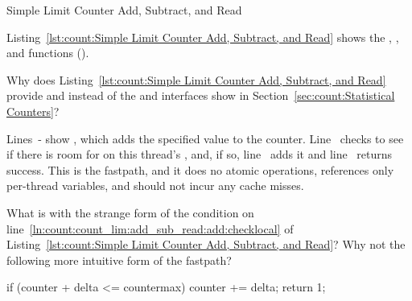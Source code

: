 \begin{listing}[tbp]

\caption{Simple Limit Counter Add, Subtract, and Read}
\label{lst:count:Simple Limit Counter Add, Subtract, and Read}
\end{listing}

Listing~\ref{lst:count:Simple Limit Counter Add, Subtract, and Read}
shows the , , and 
functions ().


\QuickQuiz{}
	Why does
	Listing~\ref{lst:count:Simple Limit Counter Add, Subtract, and Read}
	provide  and  instead of the
	 and  interfaces show in
	Section~\ref{sec:count:Statistical Counters}?
 \QuickQuizEnd

\begin{lineref}
Lines~- show ,
which adds the specified value 
to the counter.
Line~ checks to see if there is room for
 on this thread's
, and, if so,
line~ adds it and line~ returns success.
This is the  fastpath, and it does no atomic operations,
references only per-thread variables, and should not incur any cache misses.
\end{lineref}

\QuickQuiz{}
	What is with the strange form of the condition on
	line~\ref{ln:count:count_lim:add_sub_read:add:checklocal} of
	Listing~\ref{lst:count:Simple Limit Counter Add, Subtract, and Read}?
	Why not the following more intuitive form of the fastpath?

\begin{VerbatimN}[firstnumber=3]
if (counter + delta <= countermax) {
	counter += delta;
	return 1;
}
\end{VerbatimN}
\vspace{-9pt}
 \QuickQuizEnd

